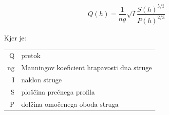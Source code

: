 \begin{ceqn}
\begin{align}
Q(h) = \dfrac{1}{ng} \sqrt{I}\dfrac{S(h)^{5/3}}{P(h)^{2/3}} \label{eq:ManningovaEnacba}
\end{align}
\end{ceqn}

Kjer je:

\begin{table}[htb!]
	\begin{tabular}{r|p{10cm}}
		Q & pretok \\
		ng & Manningov koeficient hrapavosti dna struge\\
		I & naklon struge \\
		S & ploščina prečnega profila \\
		P & dolžina omočenega oboda struga
	\end{tabular}
\end{table}



